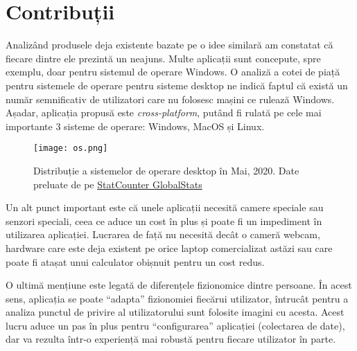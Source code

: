 \chapter*{Contribuții} 

Analizând produsele deja existente bazate pe o idee similară am constatat că fiecare dintre ele prezintă un neajuns.
Multe aplicații sunt concepute, spre exemplu, doar pentru sistemul de operare Windows.
O analiză a cotei de piață pentru sistemele de operare pentru sisteme desktop ne indică faptul că există un număr semnificativ de utilizatori care nu folosesc mașini ce rulează Windows.
Așadar, aplicația propusă este \emph{cross-platform}, putând fi rulată pe cele mai importante 3 sisteme de operare: Windows, MacOS și Linux.

\begin{figure}[h]
    \centering
    \texttt{[image: os.png]}
    \caption{Distribuție a sistemelor de operare desktop în Mai, 2020. Date preluate de pe \href{https://gs.statcounter.com/os-market-share/desktop/worldwide}{StatCounter GlobalStats}}
\end{figure}

Un alt punct important este că unele aplicații necesită camere speciale sau senzori speciali, ceea ce aduce un cost în plus și poate fi un impediment în utilizarea aplicației.
Lucrarea de față nu necesită decât o cameră webcam, hardware care este deja existent pe orice laptop comercializat astăzi sau care poate fi atașat unui calculator obișnuit pentru un cost redus.

O ultimă mențiune este legată de diferențele fizionomice dintre persoane.
În acest sens, aplicația se poate ``adapta'' fizionomiei fiecărui utilizator, întrucât pentru a analiza punctul de privire al utilizatorului sunt folosite imagini cu acesta.
Acest lucru aduce un pas în plus pentru ``configurarea'' aplicației (colectarea de date), dar va rezulta într-o experiență mai robustă pentru fiecare utilizator în parte.